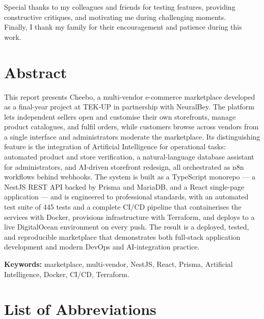 \documentclass[12pt, a4paper, oneside]{report}
\begin{document}
Special thanks to my colleagues and friends for testing features, providing constructive critiques, and motivating me during challenging moments.\\

Finally, I thank my family for their encouragement and patience during this work.

\newpage
\chapter*{Abstract}

This report presents Cheebo, a multi-vendor e-commerce marketplace
developed as a final-year project at TEK-UP in partnership with
NeuralBey. The platform lets independent sellers open and customise
their own storefronts, manage product catalogues, and fulfil orders,
while customers browse across vendors from a single interface and
administrators moderate the marketplace. Its distinguishing feature is
the integration of Artificial Intelligence for operational tasks:
automated product and store verification, a natural-language database
assistant for administrators, and AI-driven storefront redesign, all
orchestrated as n8n workflows behind webhooks. The system is built as
a TypeScript monorepo --- a NestJS REST API backed by Prisma and
MariaDB, and a React single-page application --- and is engineered to
professional standards, with an automated test suite of 445 tests and
a complete CI/CD pipeline that containerises the services with Docker,
provisions infrastructure with Terraform, and deploys to a live
DigitalOcean environment on every push. The result is a deployed,
tested, and reproducible marketplace that demonstrates both full-stack
application development and modern DevOps and AI-integration practice.

\bigskip
\noindent\textbf{Keywords:} marketplace, multi-vendor, NestJS, React, Prisma,
  Artificial Intelligence, Docker, CI/CD, Terraform.

\newpage
\tableofcontents

\newpage
\listoffigures

\newpage
\listoftables

\newpage
\chapter*{List of Abbreviations}
\end{document}
